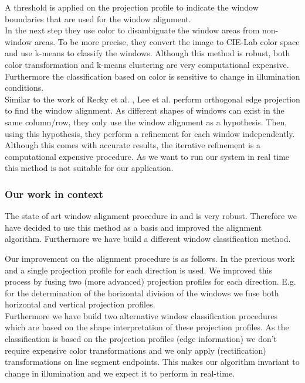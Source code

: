 A threshold is applied on the projection profile to indicate the window
boundaries that are used for the window alignment.\\

In the next step they use color to disambiguate the window areas from non-window
areas.  To be more precise, they convert the image to CIE-Lab color space and
use k-means to classify the windows.  Although this method is robust, both color
transformation and k-means clustering are very computational expensive.
Furthermore the classification based on color is sensitive to change in
illumination conditions.\\


Similar to the work of Recky et al. \cite{Recky_kmeans}, Lee et al.
\cite{Lee_extraction} perform orthogonal edge projection to find the window alignment.  As different
shapes of windows can exist in the same column/row, they only use the window alignment as
a hypothesis.  Then, using this hypothesis, they perform a refinement for each
window independently. 
Although this comes with accurate results, the iterative refinement is
a computational expensive procedure. As we want to run our system in real time
this method is not suitable for our application. \\

\subsubsection{Our work in context}
The state of art window alignment procedure in \cite{Recky_kmeans} and \cite{Lee_extraction}
is very robust.  Therefore we have decided to use this method as a basis and improved
the alignment algorithm. Furthermore we have build a different window classification method.  

Our improvement on the alignment procedure is as follows.
In the previous work \cite{Recky_kmeans} and \cite{Lee_extraction} 
a single projection profile for each direction is used.  We improved this 
process by fusing two (more advanced) projection profiles for each direction.
E.g. for the determination of the horizontal division of the windows we fuse both
horizontal and vertical projection profiles.\\

Furthermore we have build two alternative window classification procedures which are 
based on the shape interpretation of these projection profiles.
As the classification is based on the projection profiles (edge information) we
don't require expensive color transformations and we only apply (rectification)
transformations on line segment endpoints. This makes our algorithm invariant to
change in illumination and we expect it to perform in real-time.  
	










